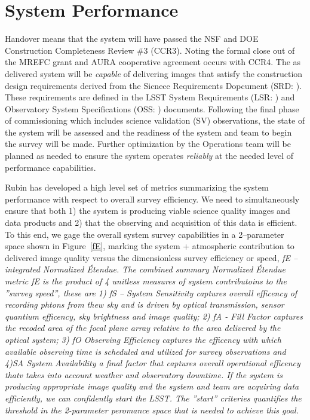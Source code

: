 \section{System Performance}{\label{secSysperf}}
  
Handover means that the system will have passed the NSF and DOE Construction Completeness Review \#3 (CCR3).  Noting the formal close out of the MREFC grant and AURA cooperative agreement occurs with CCR4. The as delivered system will be {\it capable} of delivering images that satisfy the construction design requirements derived from the Sicnece Requirements Dopcument (SRD: \cite{LPM-17}).  These requirements are defined in the LSST System Requirements (LSR: \cite{LSE-29)}) and Observatory System Specifications (OSS: \cite{LSE-30}) documents. Following the final phase of commissioning which includes science validation (SV) observations, the state of the system will be assessed and the readiness of the system and team to begin the survey will be made. Further optimization by the Operations team will be planned as needed to ensure the system operates {\it reliably} at the needed level of performance capabilities. 

Rubin has developed a high level set of metrics summarizing the system performance with respect to overall survey efficiency. We need to simultaneously ensure that both 1) the system is producing viable science quality images and data products and 2) that the observing and acquisition of this data is efficient.  To this end, we gage the overall system survey capabilities in a 2--parameter space shown in Figure~\ref{fE}, marking the system + atmospheric contribution to delivered image quality versus the dimensionless survey efficiency or speed, \it{fE} -- integrated Normalized \'{E}tendue.  The combined summary Normalized \'{E}tendue metric \it{fE} is the product of 4 unitless measures of system contributoins to the ''survey speed'', these are 1)  \it{fS -- System Sensitivity} captures overall efficency of recording phtons from thew sky and is driven by optical transmission, sensor quantium efficency, sky brightness and image quality; 2) \it{fA - Fill Factor} captures the recoded area of the focal plane array relative to the area delivered by the optical system; 3) \it{fO Observing Efficiency} captures the efficency with which available observing time is scheduled and utilized for survey observations and 4)\it{SA System Availability} a final factor that captures overall operational efficency thatv takes into account weather and observatory downtime.   If the system is producing appropriate image quality and the system and team are acquiring data efficiently, we can confidently start the LSST.  The ''start'' criteries quantifies the threshold in the 2-parameter peromance space that is needed to achieve this goal.

